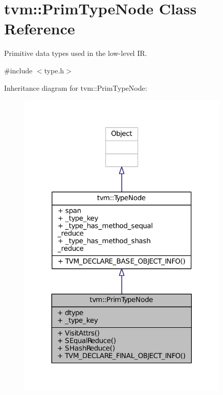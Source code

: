 \hypertarget{classtvm_1_1PrimTypeNode}{}\section{tvm\+:\+:Prim\+Type\+Node Class Reference}
\label{classtvm_1_1PrimTypeNode}


Primitive data types used in the low-\/level IR.  




{\ttfamily \#include $<$type.\+h$>$}



Inheritance diagram for tvm\+:\+:Prim\+Type\+Node\+:
\nopagebreak
\begin{figure}[H]
\begin{center}
\leavevmode
\includegraphics[width=285pt]{classtvm_1_1PrimTypeNode__inherit__graph}
\end{center}
\end{figure}


